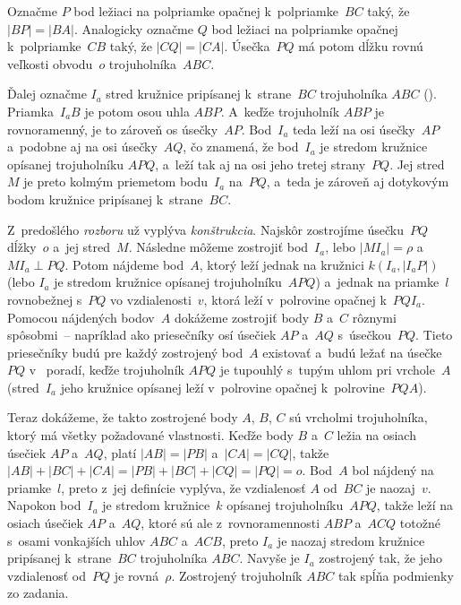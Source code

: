 {%
Označme $P$ bod ležiaci na polpriamke
opačnej k~polpriamke~$BC$ taký, že $|BP| = |BA|$. Analogicky označme $Q$ bod
ležiaci na polpriamke opačnej k~polpriamke~$CB$ taký, že $|CQ| = |CA|$.
Úsečka~$PQ$ má potom dĺžku rovnú veľkosti obvodu~$o$ trojuholníka~$ABC$.

Ďalej označme $I_a$ stred kružnice pripísanej k~strane~$BC$
trojuholníka $ABC$ (\obr). Priamka~$I_aB$ je potom osou uhla $ABP$. A~keďže
trojuholník $ABP$ je rovnoramenný, je to zároveň os úsečky~$AP$.
Bod~$I_a$ teda leží na osi úsečky~$AP$ a~podobne aj na
osi úsečky~$AQ$, čo znamená, že bod~$I_a$ je stredom kružnice
opísanej trojuholníku $APQ$, a~leží tak aj na osi jeho tretej strany~$PQ$.
Jej stred~$M$ je preto kolmým priemetom bodu~$I_a$ na~$PQ$, a~teda je
zároveň aj dotykovým bodom kružnice pripísanej k~strane~$BC$.
%

Z~predošlého {\it rozboru\/} už vyplýva {\it konštrukcia}. Najskôr
zostrojíme úsečku~$PQ$ dĺžky~$o$ a~jej stred~$M$. Následne môžeme
zostrojiť bod~$I_a$, lebo $|MI_a| = \rho$ a~$MI_a
\perp PQ$. Potom nájdeme bod~$A$, ktorý leží jednak na kružnici
$k(I_a, |I_aP|)$ (lebo $I_a$ je stredom kružnice opísanej trojuholníku~$APQ$)
a~jednak na priamke~$l$ rovnobežnej s~$PQ$ vo vzdialenosti~$v$, ktorá
leží v~polrovine opačnej k~$PQI_a$. Pomocou nájdených bodov~$A$
dokážeme zostrojiť body $B$ a~$C$ rôznymi spôsobmi~-- napríklad ako
priesečníky osí úsečiek $AP$ a~$AQ$ s~úsečkou~$PQ$. Tieto
priesečníky budú pre každý zostrojený bod~$A$ existovať a~budú ležať
na úsečke~$PQ$ v~ poradí, keďže trojuholník $APQ$ je
tupouhlý s~tupým uhlom pri vrchole~$A$ (stred~$I_a$
jeho kružnice opísanej leží v~polrovine opačnej k~polrovine~$PQA$).

Teraz dokážeme, že takto zostrojené body $A$, $B$, $C$ sú vrcholmi trojuholníka,
ktorý má všetky požadované vlastnosti.
Keďže body $B$ a~$C$ ležia na osiach úsečiek $AP$
a~$AQ$, platí $|AB| = |PB|$ a~$|CA| = |CQ|$, takže
$|AB|+|BC|+|CA| = |PB|+|BC|+|CQ| = |PQ| = o$. Bod~$A$ bol nájdený na
priamke~$l$, preto z~jej definície vyplýva, že vzdialenosť $A$ od~$BC$
je naozaj~$v$. Napokon bod~$I_a$ je stredom kružnice~$k$
opísanej trojuholníku~$APQ$, takže leží na osiach úsečiek $AP$
a~$AQ$, ktoré sú ale z~rovnoramennosti $ABP$ a~$ACQ$ totožné s~osami
vonkajších uhlov $ABC$ a~$ACB$, preto $I_a$ je naozaj stredom
kružnice pripísanej k~strane~$BC$ trojuholníka $ABC$. Navyše je
$I_a$ zostrojený tak, že jeho vzdialenosť od~$PQ$ je rovná~$\rho$.
Zostrojený trojuholník $ABC$ tak spĺňa podmienky zo zadania.

}
